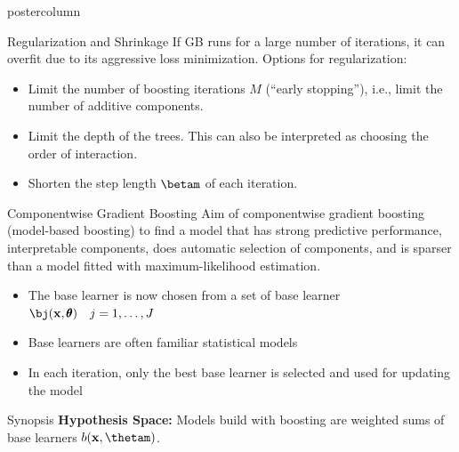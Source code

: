 \documentclass{beamer}
\newlength{\columnheight} %
\begin{document}
\begin{frame}[fragile]{}
\begin{columns}
\begin{column}{.31\textwidth}
  \begin{beamercolorbox}[center]{postercolumn}
    \begin{minipage}{.98\textwidth}
      \parbox[t][\columnheight]{\textwidth}{
        \begin{myblock}{Regularization and Shrinkage}
          If GB runs for a large number of iterations, it can overfit due to its aggressive
          loss minimization. Options for regularization:
          \begin{itemize}[$\bullet$]
            \setlength{\itemindent}{+.3in}
              \item
                Limit the number of boosting iterations $M$ (\enquote{early stopping}), i.e.,
                limit the number of additive components.
              \item
                Limit the depth of the trees. This can also be interpreted as choosing the
                order of interaction.
              \item
                Shorten the step length $\betam$ of each iteration.
          \end{itemize}
        \end{myblock}

        \begin{myblock}{Componentwise Gradient Boosting}
          Aim of componentwise gradient boosting (model-based boosting) to find a model that
          has strong predictive performance, interpretable components, does automatic selection
          of components, and is sparser than a model fitted with maximum-likelihood estimation.
          \begin{itemize}[$\bullet$]
            \setlength{\itemindent}{+.3in}
              \item
                The base learner is now chosen from a set of base learner
                $\bj(\xv,\pmb\theta) \quad j = 1,\dots, J$
              \item
                Base learners are often familiar statistical models
              \item
                In each iteration, only the best base learner is selected and used for
                updating the model
          \end{itemize}
        \end{myblock}

        \begin{myblock}{Synopsis}
        \textbf{Hypothesis Space:}
          Models build with boosting are weighted sums of base learners $b(\xv, \thetam)$.
          \vspace*{1ex}


\end{myblock}}
\end{minipage}
\end{beamercolorbox}
\end{column}
\end{columns}
\end{frame}
\end{document}
